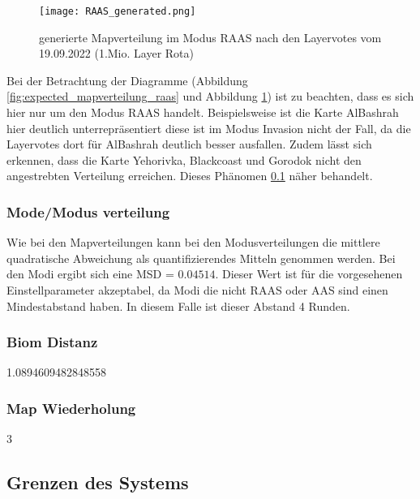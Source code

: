             \begin{figure}[h]
                \centering
                \texttt{[image: RAAS\_generated.png]}
                \caption{generierte Mapverteilung im Modus RAAS nach den Layervotes vom 19.09.2022 (1.Mio. Layer Rota)}
                \label{fig:generated_mapverteilung_raas}
            \end{figure}

            Bei der Betrachtung der Diagramme 
            (Abbildung \ref{fig:expected_mapverteilung_raas} und Abbildung \ref{fig:generated_mapverteilung_raas}) 
            ist zu beachten, dass es sich hier nur um den Modus RAAS handelt.
            Beispielsweise ist die Karte AlBashrah hier deutlich unterrepräsentiert diese ist im Modus Invasion
            nicht der Fall, da die Layervotes dort für AlBashrah deutlich besser ausfallen.
            Zudem lässt sich erkennen, dass die Karte Yehorivka, Blackcoast und Gorodok nicht den angestrebten
            Verteilung erreichen. Dieses Phänomen \ref{s:grenzen_des_systems} näher behandelt.

        \subsubsection{Mode/Modus verteilung}
            Wie bei den Mapverteilungen kann bei den Modusverteilungen die mittlere quadratische Abweichung als
            quantifizierendes Mitteln genommen werden. Bei den Modi ergibt sich eine MSD = $0.04514$.
            Dieser Wert ist für die vorgesehenen Einstellparameter akzeptabel, da Modi die nicht RAAS oder AAS sind
            einen Mindestabstand haben. In diesem Falle ist dieser Abstand 4 Runden.
        \subsubsection{Biom Distanz}
            
        1.0894609482848558
        \subsubsection{Map Wiederholung}
        3
       

    \subsection{Grenzen des Systems}
        \label{s:grenzen_des_systems}
